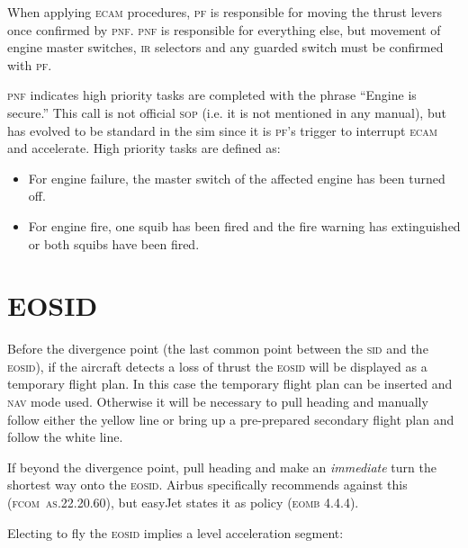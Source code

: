 \documentclass[a5paper,11pt,twoside]{book}
\newcommand{\ac}[1]{{\scshape\MakeLowercase{#1}}}
\newcommand{\inlcite}[1]{{\ac{#1}}}
\newcommand{\multicite}[1]{%
  \nopagebreak
  \noindent{{\color{blue}\footnotesize[\inlcite{#1}]}}
}
\begin{document}
When applying \ac{ECAM} procedures, \ac{PF} is responsible for moving the thrust
levers once confirmed by \ac{PNF}. \ac{PNF} is responsible for everything else,
but movement of engine master switches, \ac{IR} selectors and any guarded switch
must be confirmed with \ac{PF}.

\ac{PNF} indicates high priority tasks are completed with the phrase ``Engine is
secure.''  This call is not official \ac{SOP} (i.e. it is not mentioned in any
manual), but has evolved to be standard in the sim since it is \ac{PF}'s trigger
to interrupt \ac{ECAM} and accelerate.  High priority tasks are defined as:

\begin{itemize}
\item For engine failure, the master switch of the affected engine has been
  turned off.

\item For engine fire, one squib has been fired and the fire warning has
  extinguished or both squibs have been fired.
\end{itemize}

\multicite{FCTM~PRO.AEP.ENG}


\section{EOSID}
\label{sec-eosid}

Before the divergence point (the last common point between the \ac{SID} and the
\ac{EOSID}), if the aircraft detects a loss of thrust the \ac{EOSID} will be
displayed as a temporary flight plan. In this case the temporary flight plan can
be inserted and \ac{NAV} mode used. Otherwise it will be necessary to pull
heading and manually follow either the yellow line or bring up a pre-prepared
secondary flight plan and follow the white line.

If beyond the divergence point, pull heading and make an \emph{immediate} turn
the shortest way onto the \ac{EOSID}. Airbus specifically recommends against
this (\inlcite{FCOM~AS.22.20.60}), but easyJet states it as policy
(\inlcite{EOMB 4.4.4}).

Electing to fly the \ac{EOSID} implies a level acceleration segment:
\end{document}
